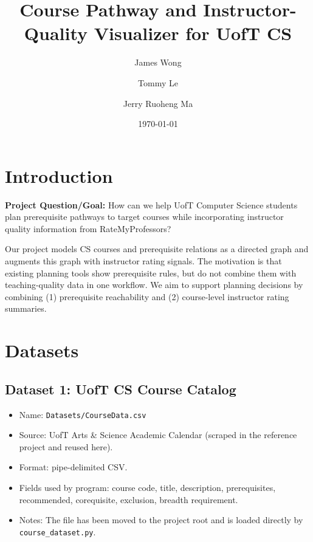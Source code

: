 \documentclass[12pt]{article}
\title{Course Pathway and Instructor-Quality Visualizer for UofT CS}
\author{James Wong \and Tommy Le \and Jerry Ruoheng Ma}
\date{\today}
\begin{document}
\maketitle
\onehalfspacing

\section{Introduction}
\textbf{Project Question/Goal:} How can we help UofT Computer Science students plan prerequisite pathways to target courses while incorporating instructor quality information from RateMyProfessors?

Our project models CS courses and prerequisite relations as a directed graph and augments this graph with instructor rating signals. The motivation is that existing planning tools show prerequisite rules, but do not combine them with teaching-quality data in one workflow. We aim to support planning decisions by combining (1) prerequisite reachability and (2) course-level instructor rating summaries.

\section{Datasets}
\subsection{Dataset 1: UofT CS Course Catalog}
\begin{itemize}[leftmargin=*]
    \item Name: \texttt{Datasets/CourseData.csv}
    \item Source: UofT Arts \& Science Academic Calendar (scraped in the reference project and reused here).
    \item Format: pipe-delimited CSV.
    \item Fields used by program: course code, title, description, prerequisites, recommended, corequisite, exclusion, breadth requirement.
    \item Notes: The file has been moved to the project root and is loaded directly by \texttt{course\_dataset.py}.
\end{itemize}
\end{document}
